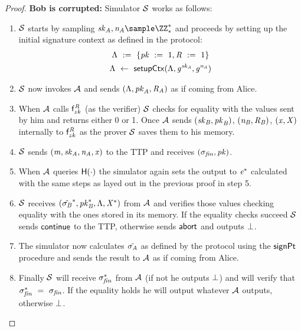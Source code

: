 \begin{proof}
    \textbf{Bob is corrupted: } Simulator $\mathcal{S}$ works as follows:
    \begin{enumerate}
        \item $\mathcal{S}$ starts by sampling $\varSecKeyAlice, \varNonceAlice \sample \cnstIntegersPrimeWithoutZero{*}$ and proceeds by setting up the initial signature context as defined in the protocol:
        \begin{gather*}
            \Lambda ~:=~ \{ \mathit{pk} ~:=~ 1, \mathit{R} ~:=~ 1 \} \\
            \Lambda ~\leftarrow~ \mathsf{setupCtx}( \Lambda, \mathit{g}^{\mathit{sk}_{\mathit{A}}}, \mathit{g}^{\mathit{\mathit{n}_{\mathit{A}}}} ) \\
        \end{gather*}
        \item $\mathcal{S}$ now invokes $\mathcal{A}$ and sends $(\Lambda, \mathit{pk}_{\mathit{A}}, \mathit{R}_{\mathit{A}})$ as if coming from Alice.
        \item When $\mathcal{A}$ calls $\mathsf{f}^{\mathit{R}}_{zk}$ (as the verifier) $\mathcal{S}$ checks for equality with the values sent by him and returns either 0 or 1.
        Once $\mathcal{A}$ sends $(\mathit{sk}_{\mathit{B}}, \mathit{pk}_{\mathit{B}})$, $(\mathit{\mathit{n}_{\mathit{B}}}, \mathit{R}_{\mathit{B}})$, $(\mathit{x}, \mathit{X})$ internally to $\mathsf{f}^{\mathit{R}}_{zk}$ as the prover $\mathcal{S}$ saves them to his memory.
        \item $\mathcal{S}$ sends $(\mathit{m}, \mathit{sk}_{\mathit{A}}, \mathit{\mathit{n}_{\mathit{A}}}, \mathit{x})$ to the TTP and receives $(\sigma_{\mathit{fin}}, \mathit{pk})$.
        \item When $\mathcal{A}$ queries $\mathsf{H} (\cdot)$ the simulator again sets the output to $\mathit{e}^*$ calculated with the same steps as layed out in the previous proof in step 5.
        \item $\mathcal{S}$ receives $(\hat{\sigma_{\mathit{B}}}^*, \mathit{pk}_{\mathit{B}}^*, \Lambda, \mathit{X}^*)$ from $\mathcal{A}$ and verifies those values checking equality with the ones stored in its memory.
        If the equality checks succeed $\mathcal{S}$ sends $\mathsf{continue}$ to the TTP, otherwise sends $\mathsf{abort}$ and outputs $\bot$.
        \item The simulator now calculates $\tilde{\sigma_{\mathit{A}}}$ as defined by the protocol using the $\mathsf{signPt}$ procedure and sends the result to $\mathcal{A}$ as if coming from Alice.
        \item Finally $\mathcal{S}$ will receive $\sigma_{\mathit{fin}}^*$ from $\mathcal{A}$ (if not he outputs $\bot$) and will verify that $\sigma_{\mathit{fin}}^* ~=~ \sigma_{\mathit{fin}}$.
        If the equality holds he will output whatever $\mathcal{A}$ outputs, otherwise $\bot$.
    \end{enumerate}
    

\end{proof}
